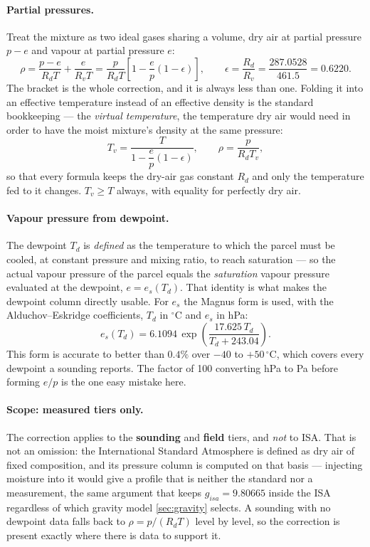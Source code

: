 \paragraph{Partial pressures.} Treat the mixture as two ideal gases sharing a volume, dry air at
partial pressure $p-e$ and vapour at partial pressure $e$:
\begin{equation}
    \rho = \frac{p-e}{R_dT} + \frac{e}{R_vT}
         = \frac{p}{R_dT}\left[1 - \frac{e}{p}\left(1 - \epsilon\right)\right], \qquad
    \epsilon = \frac{R_d}{R_v} = \frac{287.0528}{461.5} = 0.6220.
\end{equation}
The bracket is the whole correction, and it is always less than one. Folding it into an effective
temperature instead of an effective density is the standard bookkeeping --- the \emph{virtual
temperature}, the temperature dry air would need in order to have the moist mixture's density at
the same pressure:
\begin{equation} \label{eq:virtual_temperature}
    T_v = \frac{T}{1 - \dfrac{e}{p}\left(1-\epsilon\right)}, \qquad
    \rho = \frac{p}{R_dT_v},
\end{equation}
so that every formula keeps the dry-air gas constant $R_d$ and only the temperature fed to it
changes. $T_v \geq T$ always, with equality for perfectly dry air.

\paragraph{Vapour pressure from dewpoint.} The dewpoint $T_d$ is \emph{defined} as the temperature
to which the parcel must be cooled, at constant pressure and mixing ratio, to reach saturation ---
so the actual vapour pressure of the parcel equals the \emph{saturation} vapour pressure evaluated
at the dewpoint, $e=e_s(T_d)$. That identity is what makes the dewpoint column directly usable.
For $e_s$ the Magnus form is used, with the Alduchov--Eskridge coefficients, $T_d$ in
$^\circ\mathrm{C}$ and $e_s$ in hPa:
\begin{equation} \label{eq:magnus}
    e_s(T_d) = 6.1094\,\exp\!\left(\frac{17.625\,T_d}{T_d + 243.04}\right).
\end{equation}
This form is accurate to better than $0.4\%$ over $-40$ to $+50\,^\circ\mathrm{C}$, which covers
every dewpoint a sounding reports. The factor of 100 converting hPa to Pa before forming $e/p$ is
the one easy mistake here.

\paragraph{Scope: measured tiers only.} The correction applies to the \textbf{sounding} and
\textbf{field} tiers, and \emph{not} to ISA. That is not an omission: the International Standard
Atmosphere is defined as dry air of fixed composition, and its pressure column is computed on that
basis --- injecting moisture into it would give a profile that is neither the standard nor a
measurement, the same argument that keeps $g_{isa}=9.80665$ inside the ISA regardless of which
gravity model \autoref{sec:gravity} selects. A sounding with no dewpoint data falls back to
$\rho=p/(R_dT)$ level by level, so the correction is present exactly where there is data to
support it.

